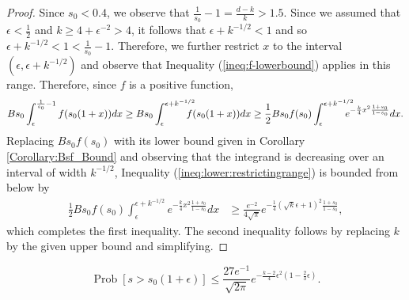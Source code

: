 \documentclass[twoside,11pt]{article}
\newcommand{\pP}[1]{\operatorname{Prob}\left[ #1 \right] }
\begin{document}
\begin{proof}
										
					Since $s_0<0.4$, we observe that $\frac{1}{s_0}-1=\frac{d-k}{k}>1.5$.  Since we assumed that $\epsilon<\frac{1}{2}$ and $k\geq 4+\epsilon^{-2}>4$, it follows that $\epsilon+k^{-1/2}<1$ and so $\epsilon+k^{-1/2}<1<\frac{1}{s_0}-1$.  Therefore, we further restrict $x$ to the interval $(\epsilon,\epsilon+k^{-1/2})$ and observe that Inequality (\ref{ineq:f-lowerbound}) applies in this range.  Therefore, since $f$ is a positive function,
						\begin{equation}\label{ineq:lower:restrictingrange}
						Bs_0 \int_\epsilon^{\frac{1}{s_0}-1} f(s_0(1+x)) dx   \geq Bs_0 \int_\epsilon^{\epsilon + k^{-1/2}}\hspace{-.15in}f(s_0(1+x)) dx 
							 \geq \frac{1}{2} Bs_0 f(s_0)  \int_\epsilon^{\epsilon + k^{-1/2}}\hspace{-.15in}e^{-\frac{k}{4}x^2\frac{1+s_0}{1-s_0}} dx.
						\end{equation}
					Replacing $Bs_0f(s_0)$ with its lower bound given in Corollary \ref{Corollary:Bsf_Bound} and observing that the integrand is decreasing over an interval of width $k^{-1/2}$, Inequality (\ref{ineq:lower:restrictingrange}) is bounded from below by
					\begin{align*}
						\frac{1}{2} Bs_0 f(s_0)  \int_\epsilon^{\epsilon + k^{-1/2}}e^{-\frac{k}{4}x^2\frac{1+s_0}{1-s_0}} dx 
							& \geq \frac{e^{-2}}{4\sqrt{\pi}}  e^{-\frac{1}{4}(\sqrt{k}\epsilon+1)^2\frac{1+s_0}{1-s_0}} , 
					\end{align*}
					which completes the first inequality.  The second inequality follows by replacing $k$ by the given upper bound and simplifying.		
				\end{proof}		
						
\begin{lemma} \label{Lemma:Upper+}
					\[  \pP{s>s_0(1+\epsilon)} \leq  \frac{27e^{-1}}{\sqrt{2\pi}}e^{-\frac{k-2}{4}\epsilon^2(1-\frac{2}{3}\epsilon) } .\]
\end{lemma}			
				
\end{document}
